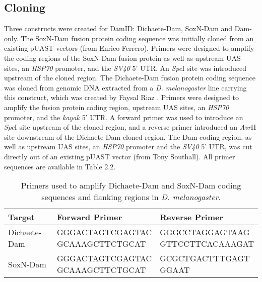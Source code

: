 \subsection{Cloning}
Three constructs were created for DamID: Dichaete-Dam, SoxN-Dam and Dam-only. The SoxN-Dam fusion protein coding sequence was initially cloned from an existing pUAST vectors (from Enrico Ferrero). Primers were designed to amplify the coding regions of the SoxN-Dam fusion protein as well as upstream UAS sites, an \emph{HSP70} promoter, and the \emph{SV40} 5' UTR. An \emph{Spe}I site was introduced upstream of the cloned region. The Dichaete-Dam fusion protein coding sequence was cloned from genomic DNA extracted from a \emph{D. melanogaster} line carrying this construct, which was created by Faysal Riaz \citep{riaz_phd}. Primers were designed to amplify the fusion protein coding region, upstream UAS sites, an \emph{HSP70} promoter, and the \emph{kayak} 5' UTR. A forward primer was used to introduce an \emph{Spe}I site upstream of the cloned region, and a reverse primer introduced an \emph{Avr}II site downstream of the Dichaete-Dam cloned region. The Dam coding region, as well as upstream UAS sites, an \emph{HSP70} promoter and the \emph{SV40} 5' UTR, was cut directly out of an existing pUAST vector (from Tony Southall). All primer sequences are available in Table 2.2.\\ 

\begin{table}[h]
\centering
\begin{tabular}{|l|p{5cm}|p{5cm}|}
\hline
\textbf{Target}       & \textbf{Forward Primer}                  & \textbf{Reverse Primer}                  \\ \hline
Dichaete-Dam & \parbox[t]{5cm}{GGGACTAGTCGAGTAC\\ GCAAAGCTTCTGCAT} & \parbox[t]{4cm}{GGGCCTAGGAGTAAG\\ GTTCCTTCACAAAGAT} \\ \hline
SoxN-Dam     & \parbox[t]{5cm}{GGGACTAGTCGAGTAC\\ GCAAAGCTTCTGCAT} & \parbox[t]{4cm}{GCGCTGACTTTGAGT\\ GGAAT} \\ \hline          
\end{tabular}
\caption{Primers used to amplify Dichaete-Dam and SoxN-Dam coding sequences and flanking regions in \emph{D. melanogaster}.}
\label{Table 2.2}
\end{table}

